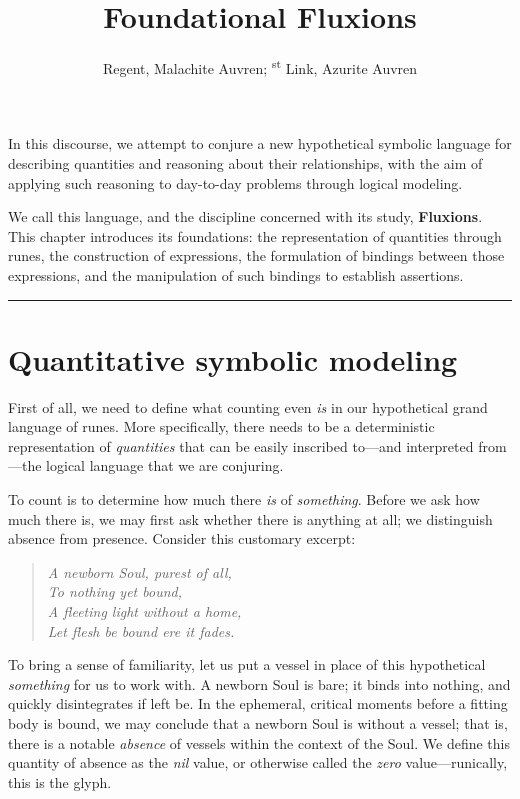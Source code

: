 \documentclass[11pt,a4paper]{article}
\title{Foundational Fluxions}
\author{Regent, Malachite Auvren; \rune{41}\textsuperscript{st} Link, Azurite Auvren}
\date{}
\newcommand{\sectionbreak}{
	\par\bigskip
	\noindent\rule{\linewidth}{0.4pt}
	\par\bigskip
}
\begin{document}
	\maketitle
	
	In this discourse, we attempt to conjure a new hypothetical symbolic language for describing quantities and reasoning about their relationships, with the aim of applying such reasoning to day-to-day problems through logical modeling.
	
	We call this language, and the discipline concerned with its study, \textbf{Fluxions}. This chapter introduces its foundations: the representation of quantities through runes, the construction of expressions, the formulation of bindings between those expressions, and the manipulation of such bindings to establish assertions.
	
	\sectionbreak
	
	\section{Quantitative symbolic modeling}
	\label{sec:quantitative-symbolic-modeling}
	
	First of all, we need to define what counting even \emph{is} in our hypothetical grand language of runes. More specifically, there needs to be a deterministic representation of \emph{quantities} that can be easily inscribed to---and interpreted from---the logical language that we are conjuring.
	
	To count is to determine how much there \emph{is} of \emph{something}. Before we ask how much there is, we may first ask whether there is anything at all; we distinguish absence from presence. Consider this customary excerpt:
	
	\begin{quote}
		\large
		\leavevmode
		\textit{A newborn Soul, purest of all, \\
				To nothing yet bound, \\
				A fleeting light without a home, \\
				Let flesh be bound ere it fades.
		}
	\end{quote}
	
	To bring a sense of familiarity, let us put a vessel in place of this hypothetical \emph{something} for us to work with. A newborn Soul is bare; it binds into nothing, and quickly disintegrates if left be. In the ephemeral, critical moments before a fitting body is bound, we may conclude that a newborn Soul is without a vessel; that is, there is a notable \emph{absence} of vessels within the context of the Soul. We define this quantity of absence as the \emph{nil} value, or otherwise called the \emph{zero} value---runically, this is the  glyph.
	
\end{document}

